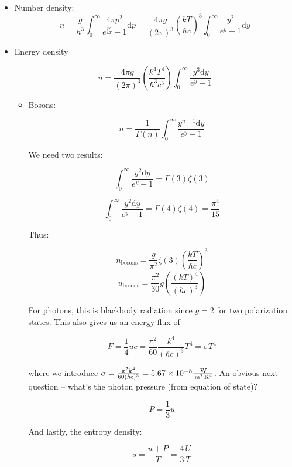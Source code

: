 \documentclass{article}
\newcommand{\unit}[1]{{\,\rm #1}}
\newcommand{\be}{\begin{equation}}
\newcommand{\ee}{\end{equation}}
\begin{document}
\begin{itemize}
    \item Number density:
    \be
    n = \frac{g}{h^3}\int_0^\infty \frac{4\pi p^2}{e^{\frac{pc}{kT}} -1} \mathrm{d}p = \frac{4\pi g}{(2\pi)^3} \left(\frac{kT}{\hbar c}\right)^3 \int_0^\infty \frac{y^2}{e^{y} -1} \mathrm{d}y  
    \ee
    
    \item Energy density
    
    \be
    u = \frac{4\pi g}{(2\pi)^3}\left(\frac{k^4T^4}{\hbar^3 c^3}\right) \int_0^\infty \frac{y^3 \mathrm{d}y}{e^y \pm 1}
    \ee
    
    \begin{itemize}
        \item Bosons:
        
        \be
        n = \frac{1}{\Gamma(n)}\int_0^\infty \frac{y^{n-1} \mathrm{d}y}{e^y - 1}
        \ee
        
        We need two results:
        
        \be
        \int_0^\infty \frac{y^{2} \mathrm{d}y}{e^y - 1} = \Gamma(3) \zeta(3)
        \ee
        
        \be
        \int_0^\infty \frac{y^{2} \mathrm{d}y}{e^y - 1} = \Gamma(4) \zeta(4) = \frac{\pi^4}{15}
        \ee
        
        Thus:
        
        \be
        \boxed{n_\text{bosons} = \frac{g}{\pi^2} \zeta(3) \left(\frac{kT}{\hbar c}\right)^3}
        \ee
        \be
        \boxed{u_\text{bosons} = \frac{\pi^2}{30} g \left(\frac{(kT)^4}{(\hbar c)^3}\right)}
        \ee
        
        For photons, this is blackbody radiation since $g=2$ for two polarization states. This also gives us an energy flux of 
        
        \be
        \boxed{F = \frac14 uc = \frac{\pi^2}{60}\frac{k^4}{(\hbar c)^3} T^4 = \sigma T^4}
        \ee
        
        where we introduce $\sigma = \frac{\pi^2 k^4}{60 (\hbar c)^3} = 5.67\times 10^{-8} \frac{\unit{W}}{\unit{m}^2\unit{K}^4}$. An obvious next question -- what's the photon pressure (from equation of state)?
        
        \be
        P = \frac13 u
        \ee
        
        And lastly, the entropy density:
        
        \be
        s = \frac{u+P}{T} = \frac43 \frac{U}{T}
        \ee
        

\end{itemize}
\end{itemize}
\end{document}
